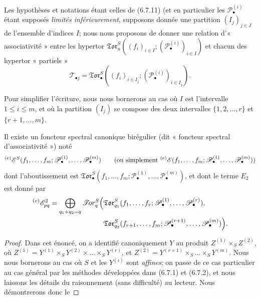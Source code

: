 \begin{env}[6.8.1]
Les hypothèses et notations étant celles de (6.7.11) (et en particulier les
$\mathscr P_\bullet^{(i)}$ étant supposés \emph{limités inférieurement}, supposons
donnée une partition $(I_j)_{j\in J}$ de l'ensemble d'indices $I$; nous nous
proposons de donner une relation d'« associativité » entre les hypertor
$\mathfrak{Tor}_n^S((f_i)_{i\in I};(\mathscr P_\bullet^{(i)})_{i\in I})$ et
chacun des hypertor « partiels »
\[
  \mathscr T_{\bullet j}
  =\mathfrak{Tor}_\bullet^S
  ((f_i)_{i\in I_j};(\mathscr P_\bullet^{(i)})_{i\in I_j}).
\]

Pour simplifier l'écriture, nous nous bornerons au cas où $I$ est
l'intervalle $1\leq i\leq m$, et où la partition $(I_j)$ se compose des deux
intervalles $\{1,2,\ldots,r\}$ et $\{r+1,\ldots,m\}$.
\end{env}

\begin{proposition}[6.8.2]
Il existe un foncteur spectral canonique birégulier \textup{(dit « foncteur spectral
d'associativité »)} noté
\[
  {}^{(e)}\mathscr E^S
  (f_1,\ldots,f_m;
   \mathscr P_\bullet^{(1)},\ldots,\mathscr P_\bullet^{(m)})
  \qquad\textup{(ou simplement ${}^{(e)}\mathscr E(f_1,\ldots,f_m;
\mathscr P_\bullet^{(1)},\ldots,\mathscr P_\bullet^{(m)})$)}
\]
dont
l'aboutissement est
$\mathfrak{Tor}_\bullet^S(f_1,\ldots,f_m;
\mathscr P_\bullet^{(1)},\ldots,\mathscr P_\bullet^{(m)})$, et dont le terme
$E_2$ est donné par
\[
\begin{split}
  {}^{(e)}\mathscr E_{pq}^2
  =\bigoplus_{q_1+q_2=q}
  \mathscr{T}\!or_q^S\Bigl(
  &\mathfrak{Tor}_{q_1}^S
  (f_1,\ldots,f_r;
   \mathscr P_\bullet^{(1)},\ldots,\mathscr P_\bullet^{(r)}),\\
  &\mathfrak{Tor}_{q_2}^S
  (f_{r+1},\ldots,f_m;
   \mathscr P_\bullet^{(r+1)},\ldots,\mathscr P_\bullet^{(m)})
  \Bigr).
\end{split}
\]
\end{proposition}

\begin{proof}
Dans cet énoncé, on a identifié canoniquement $Y$ au produit
$Z^{(1)}\times_S Z^{(2)}$, où
$Z^{(1)}=Y^{(1)}\times_S Y^{(2)}\times\ldots\times_S Y^{(r)}$, et
$Z^{(2)}=Y^{(r+1)}\times_S\ldots\times_S Y^{(m)}$. Nous nous bornerons au
cas où $S$ et les $Y^{(i)}$ sont \emph{affines}; on passe de ce cas particulier au
cas général par les méthodes développées dans (6.7.1) et (6.7.2), et nous
laissons les détails du raisonnement (sans difficulté) au lecteur. Nous
démontrerons donc le
\end{proof}

